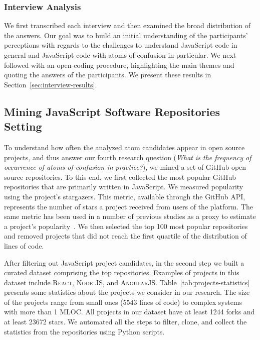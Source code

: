 \subsubsection*{Interview Analysis}

We first transcribed each interview and then examined the broad distribution of the answers. Our goal was to build an initial understanding of the participants' perceptions with regards to the challenges to understand JavaScript code in general and JavaScript code with atoms of confusion in particular. We next followed with an open-coding procedure, highlighting the main themes and quoting the answers of the participants. We present these results in Section~\ref{sec:interview-results}. 




\subsection{Mining JavaScript Software Repositories Setting}

To understand how often the analyzed atom candidates appear in open source projects, and thus answer our fourth research question (\emph{What is the frequency of occurrence of atoms of confusion in practice?}), we mined a set of GitHub open source repositories. To this end, we first collected the most popular GitHub repositories that are primarily written in JavaScript. We measured popularity using the project's stargazers. This metric, available through the GitHub API, represents the number of stars a project received from users of the platform. The same metric has been used in a number of previous studies as a proxy to estimate a project's popularity~\cite{gyimesi2019bugsjs,canedo:esem2020}. We then selected the top 100 most popular repositories and removed projects that did not reach the first quartile of the distribution of lines of code.

After filtering out JavaScript project candidates, in the second step we built a curated dataset comprising the top \minedprojects repositories. Examples of projects in this dataset include \textsc{React}, \textsc{Node JS}, and \textsc{AngularJS}. Table~\ref{tab:projects-statistics} presents some statistics about the projects we consider in our research. The size of the projects range from small ones (5543 lines of code) to complex systems with more than 1 MLOC. All projects in our dataset have at least \num{1244} forks and at least \num{23672} stars. We automated all the steps to filter, clone, and collect the statistics from the repositories using Python scripts.

